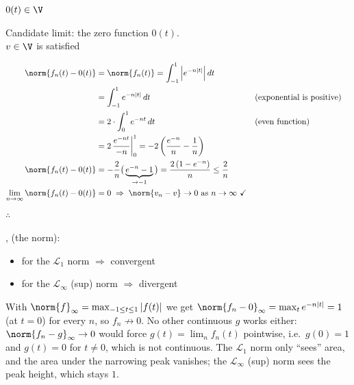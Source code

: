 \begin{example}
\begin{center}
\begin{minipage}{0.32\textwidth}
$0(t)\in\V$
\end{minipage}%
\begin{minipage}{0.64\textwidth}
Candidate limit: the zero function $0(t)$.\\ $v\in\V$ is satisfied \checkmark
\end{minipage}
\end{center}
\begin{align*}
\norm{f_n(t) - 0(t)} &= \norm{f_n(t)} = \int_{-1}^{1}\left|e^{-n|t|}\right|dt\\
&= \int_{-1}^{1} e^{-n|t|}\,dt
&&\text{(exponential is positive)}\\
&= 2\cdot\int_0^1 e^{-nt}\,dt
&&\text{(even function)}\\
&= 2\,\frac{e^{-nt}}{-n}\bigg|_0^1 = -2\left(\frac{e^{-n}}{n} - \frac1n\right)\\
\norm{f_n(t) - 0(t)} &= -\frac{2}{n}\big(\underbrace{e^{-n} - 1}_{\to -1}\big) = \frac{2\,(1-e^{-n})}{n} \le \frac2n\\
\lim_{n\to\infty}\norm{f_n(t) - 0(t)} &= 0 \;\Rightarrow\; \norm{v_n - v}\to 0 \text{ as } n\to\infty \ \checkmark
\end{align*}
$\therefore$ 
\end{example}

\sep
{} (the norm):
\begin{itemize}[nosep]
\item for the $\mathcal{L}_1$ norm $\Rightarrow$ convergent
\item for the $\mathcal{L}_\infty$ (sup) norm $\Rightarrow$ divergent
\end{itemize}
\begin{insight}
With $\norm{f}_\infty = \max_{-1\le t\le 1}|f(t)|$ we get $\norm{f_n - 0}_\infty = \max_t e^{-n|t|} = 1$ (at $t=0$) for every $n$, so $f_n\not\to 0$. No other continuous $g$ works either: $\norm{f_n - g}_\infty\to0$ would force $g(t) = \lim_n f_n(t)$ pointwise, i.e.\ $g(0)=1$ and $g(t)=0$ for $t\neq0$, which is not continuous. The $\mathcal L_1$ norm only ``sees'' area, and the area under the narrowing peak vanishes; the $\mathcal L_\infty$ (sup) norm sees the peak height, which stays $1$.
\end{insight}

